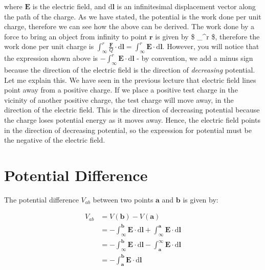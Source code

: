 \documentclass[
  letterpaper,
  DIV=11,
  numbers=noendperiod]{scrreprt}
\begin{document}
where \(\mathrm{\mathbf{E}}\) is the electric field, and
\(\mathrm{d}\mathrm{\mathbf{l}}\) is an infinitesimal displacement
vector along the path of the charge. As we have stated, the potential is
the work done per unit charge, therefore we can see how the above can be
derived. The work done by a force to bring an object from infinity to
point \(\mathrm{\mathbf{r}}\) is given by \$ \int\_\infty\^{}r
 \cdot {}\$, therefore the
work done per unit charge is
\(\int_\infty^r \frac{\mathrm{\mathbf{F}}}{Q} \cdot \mathrm{d}\mathrm{\mathbf{l}}= \int_\infty^r \mathrm{\mathbf{E}}\cdot \mathrm{d}\mathrm{\mathbf{l}}\).
However, you will notice that the expression shown above is
\(- \int_\infty^r \mathrm{\mathbf{E}}\cdot \mathrm{d}\mathrm{\mathbf{l}}\)
- by convention, we add a minus sign because the direction of the
electric field is the direction of \emph{decreasing} potential. Let me
explain this. We have seen in the previous lecture that electric field
lines point away from a positive charge. If we place a positive test
charge in the vicinity of another positive charge, the test charge will
move away, in the direction of the electric field. This is the direction
of decreasing potential because the charge loses potential energy as it
moves away. Hence, the electric field points in the direction of
decreasing potential, so the expression for potential must be the
negative of the electric field.

\section{Potential Difference}\label{potential-difference}

The potential difference \(V_{ab}\) between two points
\(\mathrm{\mathbf{a}}\) and \(\mathrm{\mathbf{b}}\) is given by:

\[
\begin{split} 
V_{ab} & = V(\mathrm{\mathbf{b}}) − V(\mathrm{\mathbf{a}}) \\
& = -\int_{\infty}^{\mathrm{\mathbf{b}}} \mathrm{\mathbf{E}}\cdot \mathrm{d} \mathrm{\mathbf{l}}+ \int_{\infty}^{\mathrm{\mathbf{a}}} \mathrm{\mathbf{E}}\cdot \mathrm{d} \mathrm{\mathbf{l}}\\
& = -\int_{\infty}^{\mathrm{\mathbf{b}}} \mathrm{\mathbf{E}}\cdot \mathrm{d} \mathrm{\mathbf{l}}- \int_{\mathrm{\mathbf{a}}}^{\infty} \mathrm{\mathbf{E}}\cdot \mathrm{d} \mathrm{\mathbf{l}}\\
& = -\int_{\mathrm{\mathbf{a}}}^{\mathrm{\mathbf{b}}} \mathrm{\mathbf{E}}\cdot \mathrm{d} \mathrm{\mathbf{l}}
\end{split}
\]
\end{document}
